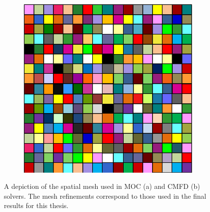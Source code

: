 \begin{figure}[h!]
\begin{subfigure}{0.45\textwidth}
		\includegraphics[width=\linewidth]{figures/cmfd_mesh.PNG}
		\caption{}
		\label{fig:cmfd-mesh-b}
	\end{subfigure}
	\caption[]{A depiction of the spatial mesh used in MOC (a) and CMFD (b) solvers. The mesh refinements correspond to those used in the final results for this thesis.}
	\label{fig:cmfd-mesh}
\end{figure}

